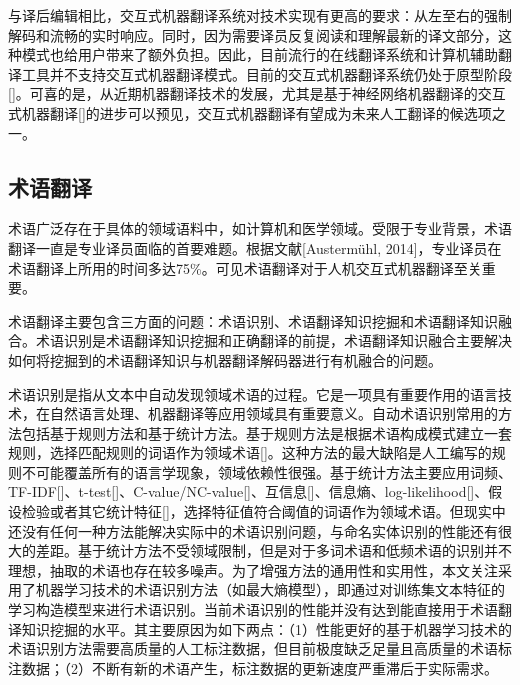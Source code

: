 与译后编辑相比，交互式机器翻译系统对技术实现有更高的要求：从左至右的强制解码和流畅的实时响应。同时，因为需要译员反复阅读和理解最新的译文部分，这种模式也给用户带来了额外负担。因此，目前流行的在线翻译系统和计算机辅助翻译工具并不支持交互式机器翻译模式。目前的交互式机器翻译系统仍处于原型阶段[\cite{Koehn:2009b,Koehn:2014,Cheng:2016}]。可喜的是，从近期机器翻译技术的发展，尤其是基于神经网络机器翻译的交互式机器翻译[\cite{Knowles:2016}]的进步可以预见，交互式机器翻译有望成为未来人工翻译的候选项之一。

\subsection{术语翻译}

术语广泛存在于具体的领域语料中，如计算机和医学领域。受限于专业背景，术语翻译一直是专业译员面临的首要难题。根据文献[Austermühl, 2014]，专业译员在术语翻译上所用的时间多达75\%。可见术语翻译对于人机交互式机器翻译至关重要。

术语翻译主要包含三方面的问题：术语识别、术语翻译知识挖掘和术语翻译知识融合。术语识别是术语翻译知识挖掘和正确翻译的前提，术语翻译知识融合主要解决如何将挖掘到的术语翻译知识与机器翻译解码器进行有机融合的问题。

术语识别是指从文本中自动发现领域术语的过程。它是一项具有重要作用的语言技术，在自然语言处理、机器翻译等应用领域具有重要意义。自动术语识别常用的方法包括基于规则方法和基于统计方法。基于规则方法是根据术语构成模式建立一套规则，选择匹配规则的词语作为领域术语[\cite{Ananiadou:1994,Dagan:1994,Frantzi:1999}]。这种方法的最大缺陷是人工编写的规则不可能覆盖所有的语言学现象，领域依赖性很强。基于统计方法主要应用词频、TF-IDF[\cite{Evans:1995,Martins:2010}]、t-test[\cite{Fahmi:2007,Wermter:2005}]、C-value/NC-value[\cite{Frantzi:1999,Frantzi:2000}]、互信息[\cite{Daille:1996}]、信息熵、log-likelihood[\cite{Cohen:1995,Lefever:2009}]、假设检验或者其它统计特征[\cite{Burkett:2010b,Kozakov:2004,Park:2002,Sclano:2007}]，选择特征值符合阈值的词语作为领域术语。但现实中还没有任何一种方法能解决实际中的术语识别问题，与命名实体识别的性能还有很大的差距。基于统计方法不受领域限制，但是对于多词术语和低频术语的识别并不理想，抽取的术语也存在较多噪声。为了增强方法的通用性和实用性，本文关注采用了机器学习技术的术语识别方法（如最大熵模型），即通过对训练集文本特征的学习构造模型来进行术语识别。当前术语识别的性能并没有达到能直接用于术语翻译知识挖掘的水平。其主要原因为如下两点：（1）性能更好的基于机器学习技术的术语识别方法需要高质量的人工标注数据，但目前极度缺乏足量且高质量的术语标注数据；（2）不断有新的术语产生，标注数据的更新速度严重滞后于实际需求。

